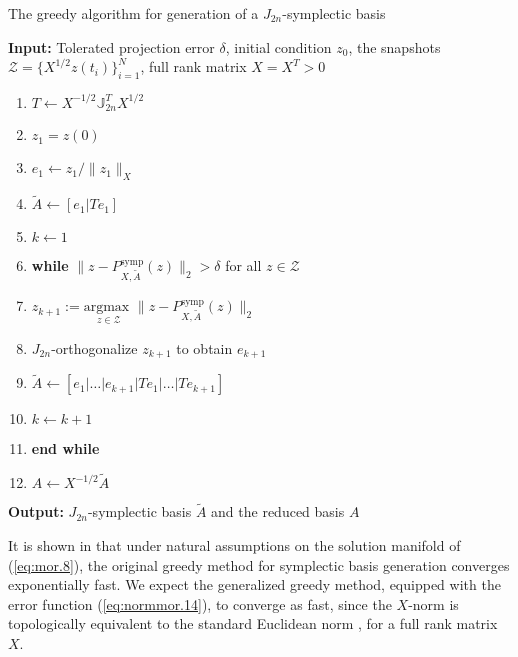 \begin{algorithm} 
\caption{The greedy algorithm for generation of a $J_{2n}$-symplectic basis} \label{alg:2}
{\bf Input:} Tolerated projection error $\delta$, initial condition $ z_0$, the snapshots $\mathcal Z = \{X^{1/2} z(t_i)\}_{i=1}^{N}$, full rank matrix $X=X^T>0$
\begin{enumerate}
\item $T \leftarrow X^{-1/2}\mathbb J_{2n}^T X^{1/2}$
\item $z_1 = z(0)$
\item $e_1 \leftarrow z_1/ \| z_1 \|_X$
\item $\tilde A \leftarrow [e_1|Te_1]$
\item $k \leftarrow 1$
\item \textbf{while} $\| z - P^\text{symp}_{X,\tilde A}( z ) \|_2 > \delta$ for all $z \in \mathcal Z$
\item \hspace{0.5cm} $z_{k+1} := \underset{z\in \mathcal Z}{\text{argmax }} \| z - P^\text{symp}_{X,\tilde A}( z ) \|_2$
\item \hspace{0.5cm} $J_{2n}$-orthogonalize $z_{k+1}$ to obtain $e_{k+1}$
\item \hspace{0.5cm} $\tilde A \leftarrow [e_1|\dots |e_{k+1} | Te_1|\dots| Te_{k+1}]$
\item \hspace{0.5cm} $k \leftarrow k+1$
\item \textbf{end while}
\item $A\leftarrow X^{-1/2} \tilde A$
\end{enumerate}
\vspace{0.5cm}
{\bf Output:} $J_{2n}$-symplectic basis $\tilde A$ and the reduced basis $A$
\end{algorithm}

It is shown in \cite{doi:10.1137/17M1111991} that under natural assumptions on the solution manifold of (\ref{eq:mor.8}), the original greedy method for symplectic basis generation converges exponentially fast. We expect the generalized greedy method, equipped with the error function (\ref{eq:normmor.14}), to converge as fast, since the $X$-norm is topologically equivalent to the standard Euclidean norm \cite{friedman1970foundations}, for a full rank matrix $X$.

